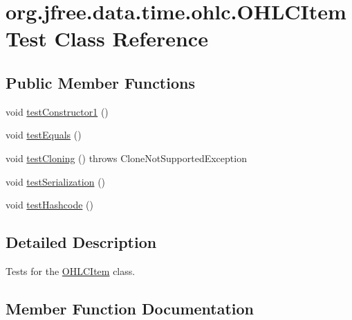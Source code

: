 \hypertarget{classorg_1_1jfree_1_1data_1_1time_1_1ohlc_1_1_o_h_l_c_item_test}{}\section{org.\+jfree.\+data.\+time.\+ohlc.\+O\+H\+L\+C\+Item\+Test Class Reference}
\label{classorg_1_1jfree_1_1data_1_1time_1_1ohlc_1_1_o_h_l_c_item_test}
\subsection*{Public Member Functions}
\begin{DoxyCompactItemize}
\item 
void \mbox{\hyperlink{classorg_1_1jfree_1_1data_1_1time_1_1ohlc_1_1_o_h_l_c_item_test_a85f8b13ad55f9c11ab43e2f1cc72a4ba}{test\+Constructor1}} ()
\item 
void \mbox{\hyperlink{classorg_1_1jfree_1_1data_1_1time_1_1ohlc_1_1_o_h_l_c_item_test_a116b1894c08d5485c86a53dd2cc03244}{test\+Equals}} ()
\item 
void \mbox{\hyperlink{classorg_1_1jfree_1_1data_1_1time_1_1ohlc_1_1_o_h_l_c_item_test_a3c2bda90678fa1eba2ac4fc1d563b527}{test\+Cloning}} ()  throws Clone\+Not\+Supported\+Exception 
\item 
void \mbox{\hyperlink{classorg_1_1jfree_1_1data_1_1time_1_1ohlc_1_1_o_h_l_c_item_test_a5b45681110a7f3e3a40cf428d4171d2b}{test\+Serialization}} ()
\item 
void \mbox{\hyperlink{classorg_1_1jfree_1_1data_1_1time_1_1ohlc_1_1_o_h_l_c_item_test_af6a63d9a00586262c54c3a708daa2ccd}{test\+Hashcode}} ()
\end{DoxyCompactItemize}


\subsection{Detailed Description}
Tests for the \mbox{\hyperlink{classorg_1_1jfree_1_1data_1_1time_1_1ohlc_1_1_o_h_l_c_item}{O\+H\+L\+C\+Item}} class. 

\subsection{Member Function Documentation}
\mbox{\label{classorg_1_1jfree_1_1data_1_1time_1_1ohlc_1_1_o_h_l_c_item_test_a3c2bda90678fa1eba2ac4fc1d563b527}} 
